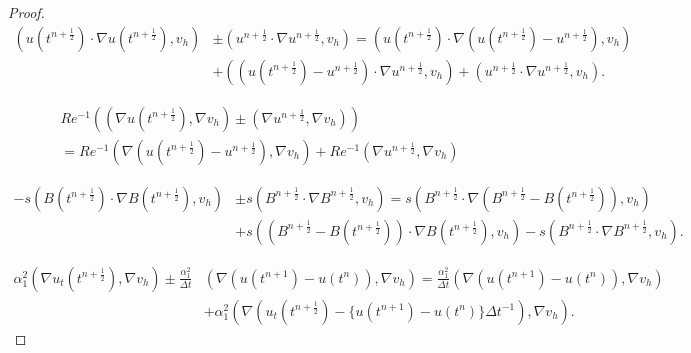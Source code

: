 \documentclass[11pt]{article}%
\numberwithin{equation}{section}
\def\grad{{\nabla}}
\def\nplushalf{{n+\frac12}}
\begin{document}
\begin{proof}
	\begin{equation}
	\begin{split}
	(u(t^{\nplushalf})\cdot \grad{u}(t^{\nplushalf}),v_{h}) & \pm (u^{\nplushalf}\cdot \grad{u}^{\nplushalf},v_{h}) = (u(t^{\nplushalf})\cdot \grad{(u(t^{\nplushalf}) - u^{\nplushalf})},v_{h}) \\
	& + ((u(t^{\nplushalf}) - u^{\nplushalf})\cdot \grad{u}^{\nplushalf},v_{h}) + (u^{\nplushalf} \cdot \grad{u}^{\nplushalf},v_{h}).
	\end{split}
	\label{eq:3.37}
	\end{equation}
	
	\begin{multline}
	Re^{-1}\left( (\grad{u}(t^{\nplushalf}),\grad{v_{h}}) \pm (\grad{u}^{\nplushalf},\grad{v_{h}}) \right)  \\ = Re^{-1}(\grad{(u(t^{\nplushalf}) - u^{\nplushalf})},\grad{v_{h}}) + Re^{-1}(\grad{u}^{\nplushalf},\grad{v_{h}})
	\label{eq:3.38}
	\end{multline}
		
	\begin{equation}
	\begin{split}
	-s(B(t^{\nplushalf})\cdot \grad{B}(t^{\nplushalf}),v_{h}) & \pm s(B^{\nplushalf}\cdot \grad{B}^{\nplushalf},v_{h}) = s(B^{\nplushalf}\cdot\grad{(B^{\nplushalf} - B(t^{\nplushalf}))},v_{h}) \\
	& + s((B^{\nplushalf} - B(t^{\nplushalf}))\cdot \grad{B}(t^{\nplushalf}),v_{h}) - s(B^{\nplushalf}\cdot \grad{B}^{\nplushalf},v_{h}).
	\end{split}
	\label{eq:3.40}
	\end{equation}
	
	\begin{equation}
	\begin{split}
	\alpha_1^2(\nabla u_{t}(t^{\nplushalf}),\nabla v_{h}) \pm \frac{\alpha_1^2}{\Delta t}&(\nabla (u(t^{n+1}) - u(t^{n})),\nabla v_{h}) = \frac{\alpha_1^2}{\Delta t}(\nabla (u(t^{n+1}) - u(t^{n})),\nabla v_{h}) \\
	& +\alpha_1^2(\nabla(u_{t}(t^{\nplushalf}) - \{u(t^{n+1}) - u(t^{n})\}\Delta t^{-1}),\nabla v_{h}).
	\end{split}
	\label{eq:3.62}
	\end{equation}


\end{proof}
\end{document}
